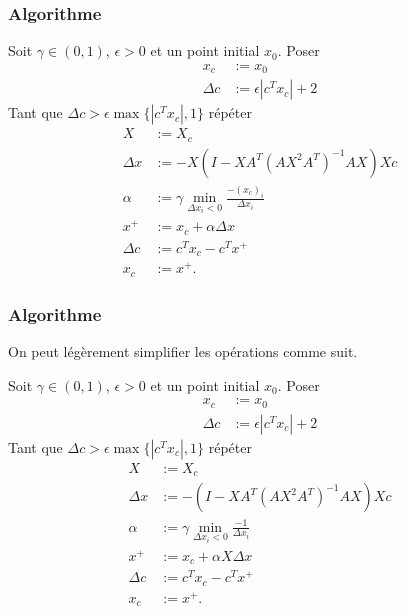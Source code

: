 \documentclass[usepdftitle=false]{beamer}
\begin{document}
\begin{frame}
\frametitle{Algorithme}

Soit $\gamma \in (0,1)$, $\epsilon > 0$ et un point initial $x_0$.
Poser
\begin{align*}
x_c &:= x_0 \\
\Delta c &:= \epsilon|c^Tx_c|+2
\end{align*}
Tant que $\Delta c > \epsilon\max\{|c^Tx_c|,1\}$ répéter
\begin{align*}
X &:= X_c \\
\Delta x &:= -X(I - XA^T(AX^2A^T)^{-1}AX)Xc \\
\alpha &:= \gamma \min_{\Delta x_i < 0} \frac{-(x_c)_i}{\Delta x_i} \\
x^+ &:= x_c + \alpha \Delta x \\
\Delta c &:= c^Tx_c - c^Tx^+ \\
x_c &:= x^+.
\end{align*}

\end{frame}

\begin{frame}
	\frametitle{Algorithme}

	On peut légèrement simplifier les opérations comme suit.
	
	Soit $\gamma \in (0,1)$, $\epsilon > 0$ et un point initial $x_0$.
	Poser
	\begin{align*}
		x_c &:= x_0 \\
		\Delta c &:= \epsilon|c^Tx_c|+2
	\end{align*}
	Tant que $\Delta c > \epsilon\max\{|c^Tx_c|,1\}$ répéter
	\begin{align*}
		X &:= X_c \\
		\Delta x &:= -(I - XA^T(AX^2A^T)^{-1}AX)Xc \\
		 \alpha &:= \gamma \min_{\Delta x_i < 0} \frac{-1}{\Delta x_i} \\
		 x^+ &:= x_c + \alpha X \Delta x \\
		\Delta c &:= c^Tx_c - c^Tx^+ \\
		x_c &:= x^+.
	\end{align*}
	
\end{frame}
\end{document}
